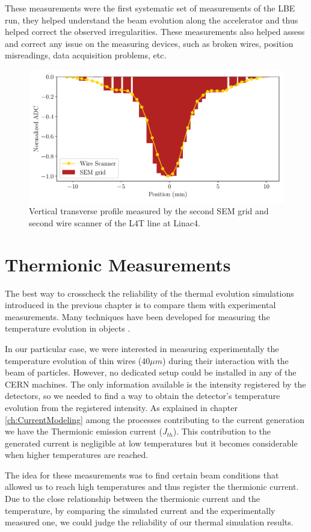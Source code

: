 These measurements were the first systematic set of measurements of the LBE run, they helped understand the beam evolution along the accelerator and thus helped correct the observed irregularities. These measurements also helped assess and correct any issue on the measuring devices, such as broken wires, position misreadings, data acquisition problems, etc.  

\begin{figure}[h]
    \centering
    \includegraphics[width=0.6\columnwidth]{VertProf/VertProf.pdf}
    \caption{Vertical transverse profile measured by the second SEM grid and second wire scanner of the L4T line at Linac4.}
    \label{fig:VertProf}
\end{figure}

\section{Thermionic Measurements}

The best way to crosscheck the reliability of the thermal evolution simulations introduced in the previous chapter is to compare them with experimental measurements. Many techniques have been developed for measuring the temperature evolution in objects \parencite[][]{ref:ThMeas1}. 

In our particular case, we were interested in measuring experimentally the temperature evolution of thin wires ($40 \mu m$) during their interaction with the beam of particles. However, no dedicated setup could be installed in any of the CERN machines. The only information available is the intensity registered by the detectors, so we needed to find a way to obtain the detector's temperature evolution from the registered intensity.  As explained in chapter \ref{ch:CurrentModeling} among the processes contributing to the current generation we have the Thermionic emission current ($J_{th}$). This contribution to the generated current is negligible at low temperatures but it becomes considerable when higher temperatures are reached. 

The idea for these measurements was to find certain beam conditions that allowed us to reach high temperatures and thus register the thermionic current. Due to the close relationship between the thermionic current and the temperature, by comparing the simulated current and the experimentally measured one, we could judge the reliability of our thermal simulation results. 

